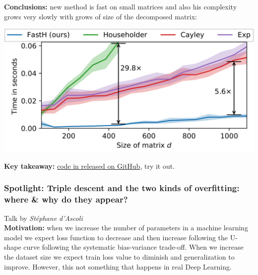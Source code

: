 {\bf Conclusions:} new method is fast on small matrices and also his complexity grows very slowly with grows of size of the decomposed matrix: \\
\begin{center}
  \includegraphics[scale=0.2]{neurips-2020/images/fastH.png} \\
\end{center}

{\bf Key takeaway:} \href{https://github.com/AlexanderMath/fasth/}{code in released on GitHub}, try it out. \\


\subsubsection{Spotlight: Triple descent and the two kinds of overfitting: where & why do they appear? \cite{dascoli2020triple}}

Talk by \textit{Stéphane d'Ascoli} \\

{\bf Motivation:} when we increase the number of parameters in a machine learning model we expect loss function to decrease and then increase following the U-shape curve following the systematic bias-variance trade-off. When we increase the dataset size we expect train loss value to diminish and generalization to improve.
However, this not something that happens in real Deep Learning. \\

